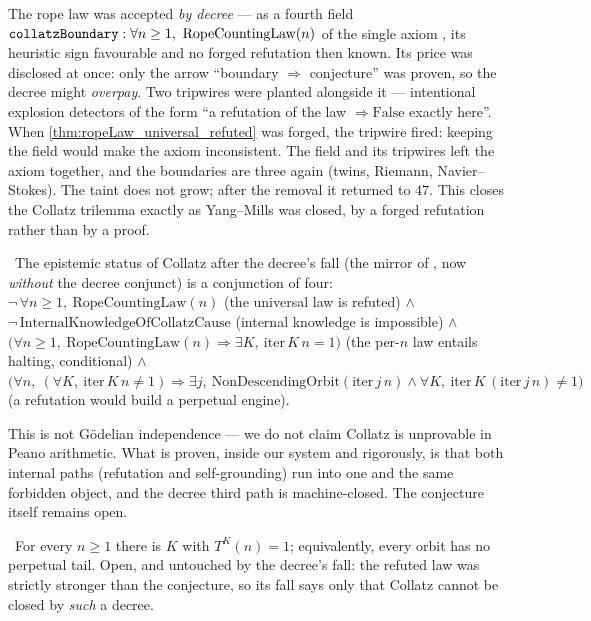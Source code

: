The rope law was accepted \emph{by decree} --- as a fourth field
$\code{collatzBoundary}:\forall n\ge 1,\ \mathrm{RopeCountingLaw}(n)$ of the single axiom \axiom{},
its heuristic sign favourable and no forged refutation then known. Its price was disclosed at once:
only the arrow ``boundary $\Rightarrow$ conjecture'' was proven, so the decree might \emph{overpay}.
Two tripwires were planted alongside it --- intentional explosion detectors of the form ``a
refutation of the law $\Rightarrow \mathrm{False}$ exactly here''. When
\cref{thm:ropeLaw_universal_refuted} was forged, the tripwire fired: keeping the field would make the
axiom inconsistent. The field and its tripwires left the axiom together, and the boundaries are three
again (twins, Riemann, Navier--Stokes). The taint does not grow; after the removal it returned to
$47$. This closes the Collatz trilemma exactly as Yang--Mills was closed, by a forged refutation
rather than by a proof.

\begin{theorem}\label{thm:collatz_open_status}
\green{}\ The epistemic status of Collatz after the decree's fall (the mirror of
, now \emph{without} the decree conjunct) is a conjunction of
four: $\neg\,\forall n\ge 1,\ \mathrm{RopeCountingLaw}(n)$ (the universal law is refuted) $\wedge$
$\neg\,\mathrm{InternalKnowledgeOfCollatzCause}$ (internal knowledge is impossible) $\wedge$
$\bigl(\forall n\ge 1,\ \mathrm{RopeCountingLaw}(n)\Rightarrow\exists K,\ \mathrm{iter}\,K\,n=1\bigr)$
(the per-$n$ law entails halting, conditional) $\wedge$
$\bigl(\forall n,\ (\forall K,\ \mathrm{iter}\,K\,n\neq 1)\Rightarrow \exists j,\
\mathrm{NonDescendingOrbit}(\mathrm{iter}\,j\,n)\wedge\forall K,\ \mathrm{iter}\,K\,(\mathrm{iter}\,j\,n)\neq 1\bigr)$
(a refutation would build a perpetual engine). \leantag{collatz\_open\_status}
\end{theorem}

This is not G\"odelian independence --- we do not claim Collatz is unprovable in Peano arithmetic.
What is proven, inside our system and rigorously, is that both internal paths (refutation and
self-grounding) run into one and the same forbidden object, and the decree third path is
machine-closed. The conjecture itself remains open.

\begin{conjecture}[Collatz]\label{conj:collatz}
\red{}\ For every $n\ge 1$ there is $K$ with $T^{K}(n)=1$; equivalently, every orbit has no perpetual tail.
Open, and untouched by the decree's fall: the refuted law was strictly stronger than the
conjecture, so its fall says only that Collatz cannot be closed by \emph{such} a decree.
\end{conjecture}

